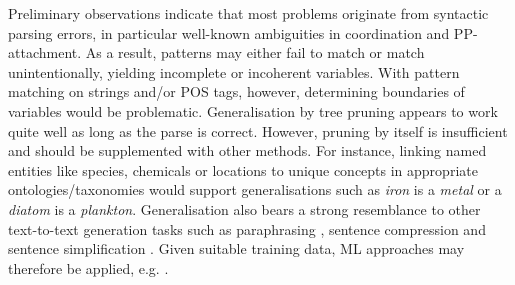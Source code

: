 \documentclass[11pt]{article}
\begin{document}
Preliminary observations indicate that most problems originate from syntactic parsing errors, in particular well-known ambiguities in coordination and PP-attachment.
As a result, patterns may either fail to match or match unintentionally, yielding incomplete or incoherent variables.     
With pattern matching on strings and/or POS tags, however, determining boundaries of variables would be problematic.
%
%
Generalisation by tree pruning appears to work quite well as long as the parse is correct.
However, pruning by itself is insufficient and should be supplemented with other methods.
For instance, linking named entities like species, chemicals or locations to unique concepts in appropriate ontologies/taxonomies would support generalisations such as \emph{iron} is a \emph{metal} or a \emph{diatom} is a \emph{plankton}. 
Generalisation also bears a strong resemblance to other text-to-text generation tasks such as paraphrasing \cite{AndroutsopoulosMalakasiotis:2010}, sentence compression \cite{jing2000sentence} and sentence simplification \cite{shardlow2014survey}.
Given suitable training data,  ML approaches may therefore be applied, e.g. \cite{knight2002,CohnLapata:2009}.
\end{document}
